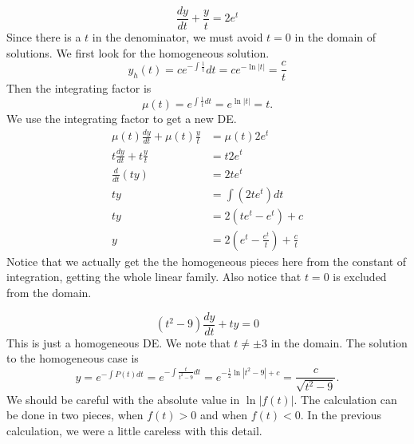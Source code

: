 \documentclass[fleqn,letterpaper]{report}
\begin{document}
\begin{example}
\label{linear-example1}
\begin{equation*}
\frac{dy}{dt} + \frac{y}{t} = 2e^t
\end{equation*}
Since there is a $t$ in the denominator, we must avoid $t=0$
in the domain of solutions. We first look for the homogeneous
solution.
\begin{equation*}
y_h(t) = ce^{-\int \frac{1}{t}} dt = ce^{-\ln |t|} = \frac{c}{t} 
\end{equation*}
Then the integrating factor is
\begin{equation*}
\mu(t) = e^{\int \frac{1}{t} dt } = e^{\ln |t|} = t.
\end{equation*}
We use the integrating factor to get a new DE.
\begin{align*}
\mu(t) \frac{dy}{dt} + \mu(t) \frac{y}{t} & = \mu(t) 2e^t\\
t \frac{dy}{dt} + t \frac{y}{t} & = t 2e^t\\
\frac{d}{dt} (t y) & = 2te^t \\
ty & = \int (2te^t) dt \\
ty & = 2(te^t - e^t) + c \\
y & = 2 \left( e^t - \frac{e^t}{t} \right) + \frac{c}{t}
\end{align*}
Notice that we actually get the the homogeneous pieces here
from the constant of integration, getting the whole linear
family. Also notice that $t=0$ is excluded from the domain.
\end{example}

\begin{example}
\begin{equation*}
(t^2-9) \frac{dy}{dt} + ty = 0 
\end{equation*}
This is just a homogeneous DE. We note that $t \neq \pm 3$ in the domain.
The solution to the homogeneous case is
\begin{equation*}
y = e^{-\int P(t) dt} = e^{-\int \frac{t}{t^2-9} dt} = e^{
- \frac{1}{2} \ln |t^2-9| + c} = \frac{c}{\sqrt{t^2-9}}.
\end{equation*}
We should be careful with the absolute value in $\ln |f(t)|$.
The calculation can be done in two pieces, when $f(t) > 0$
and when $f(t) < 0$. In the previous calculation, we were a
little careless with this detail.
\end{example}
\end{document}
